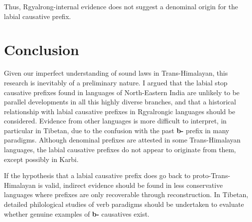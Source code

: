 \documentclass[oneside,a4paper,11pt]{article}
\newcommand{\ipa}[1]{\textbf{{\phon\mbox{#1}}}} %
\begin{document}
Thus, Rgyalrong-internal evidence does not suggest a denominal origin for the labial causative  prefix.

 \section{Conclusion}
Given our imperfect understanding of sound laws in Trans-Himalayan, this research is inevitably of a preliminary nature. I argued that the labial stop causative prefixes found in languages of North-Eastern India are unlikely to be parallel developments in all this highly diverse branches, and that a historical relationship with labial causative prefixes in Rgyalrongic languages should be considered. Evidence from other languages is more difficult to interpret, in particular in Tibetan, due to the confusion with the past \ipa{b-} prefix in many paradigms. Although denominal prefixes are attested in some Trans-Himalayan languages, the labial causative prefixes do not appear to originate from  them, except possibly in Karbi.

If the hypothesis that a labial causative prefix does go back to proto-Trans-Himalayan is valid, indirect evidence should be found in less conservative languages where prefixes are only recoverable through reconstruction. In Tibetan, detailed philological studies of verb paradigms should be undertaken to evaluate whether genuine examples of \ipa{b-} causatives exist. 
 


\end{document}
